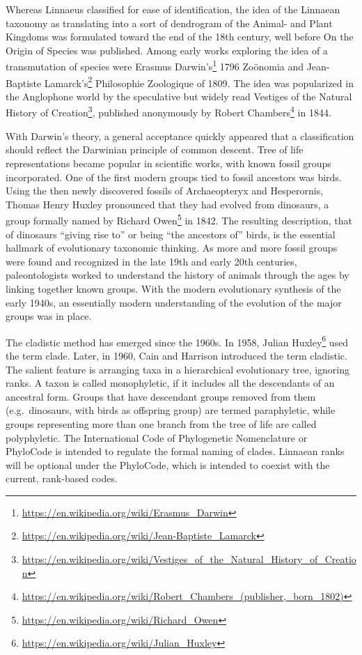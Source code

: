 \documentclass[]{book}
\let\rmarkdownfootnote\footnote%
\def\footnote{\protect\rmarkdownfootnote}
\renewcommand{\href}[2]{#2\footnote{\url{#1}}}
\begin{document}
Whereas Linnaeus classified for ease of identification, the idea of the Linnaean taxonomy as translating into a sort of dendrogram of the Animal- and Plant Kingdoms was formulated toward the end of the 18th century, well before On the Origin of Species was published. Among early works exploring the idea of a transmutation of species were \href{https://en.wikipedia.org/wiki/Erasmus_Darwin}{Erasmus Darwin's} 1796 Zoönomia and \href{https://en.wikipedia.org/wiki/Jean-Baptiste_Lamarck}{Jean-Baptiste Lamarck's} Philosophie Zoologique of 1809. The idea was popularized in the Anglophone world by the speculative but widely read \href{https://en.wikipedia.org/wiki/Vestiges_of_the_Natural_History_of_Creation}{Vestiges of the Natural History of Creation}, published anonymously by \href{https://en.wikipedia.org/wiki/Robert_Chambers_(publisher,_born_1802)}{Robert Chambers} in 1844.

With Darwin's theory, a general acceptance quickly appeared that a classification should reflect the Darwinian principle of common descent. Tree of life representations became popular in scientific works, with known fossil groups incorporated. One of the first modern groups tied to fossil ancestors was birds. Using the then newly discovered fossils of Archaeopteryx and Hesperornis, Thomas Henry Huxley pronounced that they had evolved from dinosaurs, a group formally named by \href{https://en.wikipedia.org/wiki/Richard_Owen}{Richard Owen} in 1842. The resulting description, that of dinosaurs ``giving rise to'' or being ``the ancestors of'' birds, is the essential hallmark of evolutionary taxonomic thinking. As more and more fossil groups were found and recognized in the late 19th and early 20th centuries, paleontologists worked to understand the history of animals through the ages by linking together known groups. With the modern evolutionary synthesis of the early 1940s, an essentially modern understanding of the evolution of the major groups was in place.

The cladistic method has emerged since the 1960s. In 1958, \href{https://en.wikipedia.org/wiki/Julian_Huxley}{Julian Huxley} used the term clade. Later, in 1960, Cain and Harrison introduced the term cladistic. The salient feature is arranging taxa in a hierarchical evolutionary tree, ignoring ranks. A taxon is called monophyletic, if it includes all the descendants of an ancestral form. Groups that have descendant groups removed from them (e.g.~dinosaurs, with birds as offspring group) are termed paraphyletic, while groups representing more than one branch from the tree of life are called polyphyletic. The International Code of Phylogenetic Nomenclature or PhyloCode is intended to regulate the formal naming of clades. Linnaean ranks will be optional under the PhyloCode, which is intended to coexist with the current, rank-based codes.
\end{document}
